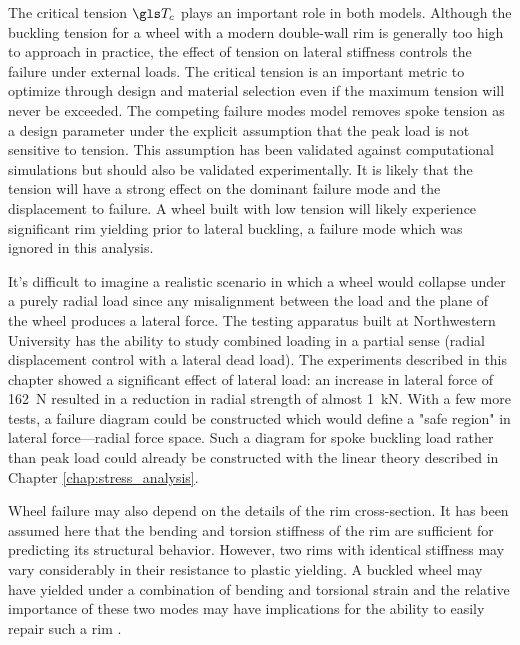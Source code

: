 \documentclass[\rootdir/thesis.tex]{subfiles}
\begin{document}
The critical tension $\T_c$ plays an important role in both models. Although the buckling tension for a wheel with a modern double-wall rim is generally too high to approach in practice, the effect of tension on lateral stiffness controls the failure under external loads. The critical tension is an important metric to optimize through design and material selection even if the maximum tension will never be exceeded. The competing failure modes model removes spoke tension as a design parameter under the explicit assumption that the peak load is not sensitive to tension. This assumption has been validated against computational simulations but should also be validated experimentally. It is likely that the tension will have a strong effect on the dominant failure mode and the displacement to failure. A wheel built with low tension will likely experience significant rim yielding prior to lateral buckling, a failure mode which was ignored in this analysis.

It's difficult to imagine a realistic scenario in which a wheel would collapse under a purely radial load since any misalignment between the load and the plane of the wheel produces a lateral force. The testing apparatus built at Northwestern University has the ability to study combined loading in a partial sense (radial displacement control with a lateral dead load). The experiments described in this chapter showed a significant effect of lateral load: an increase in lateral force of \SI{162}{N} resulted in a reduction in radial strength of almost \SI{1}{kN}. With a few more tests, a failure diagram could be constructed which would define a "safe region" in lateral force---radial force space. Such a diagram for spoke buckling load rather than peak load could already be constructed with the linear theory described in Chapter \ref{chap:stress_analysis}.

Wheel failure may also depend on the details of the rim cross-section. It has been assumed here that the bending and torsion stiffness of the rim are sufficient for predicting its structural behavior. However, two rims with identical stiffness may vary considerably in their resistance to plastic yielding. A buckled wheel may have yielded under a combination of bending and torsional strain and the relative importance of these two modes may have implications for the ability to easily repair such a rim \cite{Wilson2004}.
\end{document}
